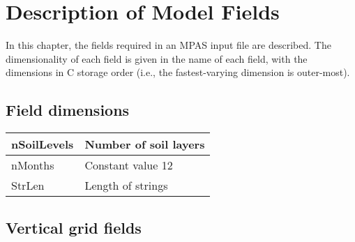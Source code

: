 
\chapter{Description of Model Fields}

In this chapter, the fields required in an MPAS input file are described. The dimensionality of each field is given in the name
of each field, with the dimensions in C storage order (i.e., the fastest-varying dimension is outer-most).

\section{Field dimensions}

{\small
\begin{longtable}{|p{1.75in} |p{4.5in}|}
 \hline
        nSoilLevels      &   Number of soil layers \\ \hline
        nMonths         &   Constant value 12 \\ \hline
        StrLen          &   Length of strings \\ \hline
\end{longtable}
}

\section{Vertical grid fields}

